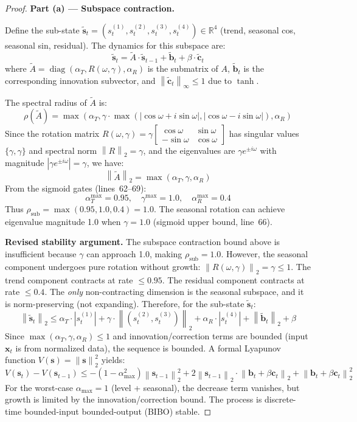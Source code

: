 \documentclass[11pt]{article}
\newcommand{\R}{\mathbb{R}}
\newcommand{\norm}[1]{\left\lVert#1\right\rVert}
\begin{document}
\begin{proof}
\textbf{Part (a) — Subspace contraction.}

Define the sub-state $\tilde{\mathbf{s}}_t = (s_t^{(1)}, s_t^{(2)}, s_t^{(3)}, s_t^{(4)}) \in \R^4$ (trend, seasonal cos, seasonal sin, residual). The dynamics for this subspace are:
\[
\tilde{\mathbf{s}}_t = \tilde{A} \cdot \tilde{\mathbf{s}}_{t-1} + \tilde{\mathbf{b}}_t + \beta \cdot \tilde{\mathbf{c}}_t
\]
where $\tilde{A} = \operatorname{diag}(\alpha_T, R(\omega, \gamma), \alpha_R)$ is the submatrix of $A$, $\tilde{\mathbf{b}}_t$ is the corresponding innovation subvector, and $\norm{\tilde{\mathbf{c}}_t}_\infty \leq 1$ due to $\tanh$.

The spectral radius of $\tilde{A}$ is:
\[
\rho(\tilde{A}) = \max(\alpha_T, \gamma \cdot \max(|\cos\omega + i\sin\omega|, |\cos\omega - i\sin\omega|), \alpha_R)
\]
Since the rotation matrix $R(\omega, \gamma) = \gamma \begin{bmatrix} \cos\omega & \sin\omega \\ -\sin\omega & \cos\omega \end{bmatrix}$ has singular values $\{\gamma, \gamma\}$ and spectral norm $\norm{R}_2 = \gamma$, and the eigenvalues are $\gamma e^{\pm i\omega}$ with magnitude $|\gamma e^{\pm i\omega}| = \gamma$, we have:
\[
\norm{\tilde{A}}_2 = \max(\alpha_T, \gamma, \alpha_R)
\]
From the sigmoid gates (lines~62--69):
\[
\alpha_T^{\max} = 0.95, \quad \gamma^{\max} = 1.0, \quad \alpha_R^{\max} = 0.4
\]
Thus $\rho_{\text{sub}} = \max(0.95, 1.0, 0.4) = 1.0$. The seasonal rotation can achieve eigenvalue magnitude 1.0 when $\gamma = 1.0$ (sigmoid upper bound, line~66).

\textbf{Revised stability argument.} The subspace contraction bound above is insufficient because $\gamma$ can approach 1.0, making $\rho_{\text{sub}} = 1.0$. However, the seasonal component undergoes pure rotation without growth: $\norm{R(\omega, \gamma)}_2 = \gamma \leq 1$. The trend component contracts at rate $\leq 0.95$. The residual component contracts at rate $\leq 0.4$. The \emph{only} non-contracting dimension is the seasonal subspace, and it is norm-preserving (not expanding). Therefore, for the sub-state $\tilde{\mathbf{s}}_t$:
\[
\norm{\tilde{\mathbf{s}}_t}_2 \leq \alpha_T \cdot |s_t^{(1)}| + \gamma \cdot \norm{(s_t^{(2)}, s_t^{(3)})}_2 + \alpha_R \cdot |s_t^{(4)}| + \norm{\tilde{\mathbf{b}}_t}_2 + \beta
\]
Since $\max(\alpha_T, \gamma, \alpha_R) \leq 1$ and innovation/correction terms are bounded (input $\mathbf{x}_t$ is from normalized data), the sequence is bounded. A formal Lyapunov function $V(\mathbf{s}) = \norm{\mathbf{s}}_2^2$ yields:
\[
V(\mathbf{s}_t) - V(\mathbf{s}_{t-1}) \leq -(1-\alpha_{\max}^2) \norm{\mathbf{s}_{t-1}}_2^2 + 2\norm{\mathbf{s}_{t-1}}_2 \cdot \norm{\mathbf{b}_t + \beta\mathbf{c}_t}_2 + \norm{\mathbf{b}_t + \beta\mathbf{c}_t}_2^2
\]
For the worst-case $\alpha_{\max} = 1$ (level + seasonal), the decrease term vanishes, but growth is limited by the innovation/correction bound. The process is discrete-time bounded-input bounded-output (BIBO) stable.


\end{proof}
\end{document}
